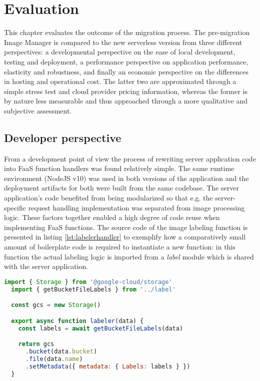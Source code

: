 \chapter{Evaluation} \label{cha:evaluation}

This chapter evaluates the outcome of the migration process. The pre-migration Image Manager is compared to the new serverless version from three different perspectives: a developmental perspective on the ease of local development, testing and deployment, a performance perspective on application performance, elasticity and robustness, and finally an economic perspective on the differences in hosting and operational cost. The latter two are approximated through a simple stress test and cloud provider pricing information, whereas the former is by nature less measurable and thus approached through a more qualitative and subjective assessment.

\section{Developer perspective}

From a development point of view the process of rewriting server application code into FaaS function handlers was found relatively simple. The same runtime environment (NodeJS v10) was used in both versions of the application and the deployment artifacts for both were built from the same codebase. The server application's code benefited from being modularized so that e.g. the server-specific request handling implementation was separated from image processing logic. These factors together enabled a high degree of code reuse when implementing FaaS functions. The source code of the image labeling function is presented in listing \ref{lst:labelerhandler} to exemplify how a comparatively small amount of boilerplate code is required to instantiate a new function: in this function the actual labeling logic is imported from a \textit{label} module which is shared with the server application.

\begin{lstlisting}[language=JavaScript,caption=Image labeler function handler,captionpos=b,label=lst:labelerhandler,showstringspaces=false,belowskip=2em,frame=tb,aboveskip=2em]
  import { Storage } from '@google-cloud/storage'
  import { getBucketFileLabels } from '../label'

  const gcs = new Storage()

  export async function labeler(data) {
    const labels = await getBucketFileLabels(data)

    return gcs
      .bucket(data.bucket)
      .file(data.name)
      .setMetadata({ metadata: { Labels: labels } })
  }
\end{lstlisting}

